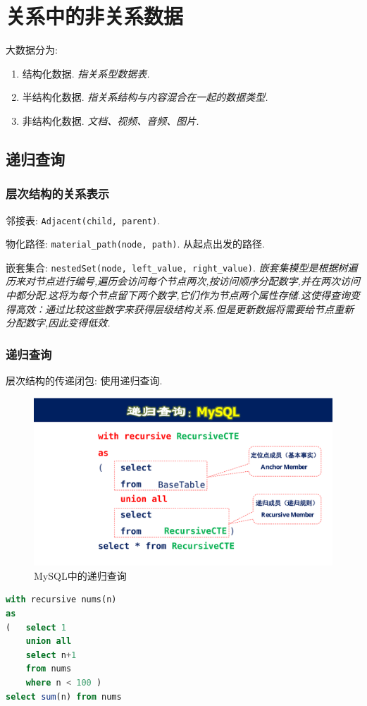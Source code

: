 \chapter{关系中的非关系数据}

大数据分为:
\begin{enumerate}
    \item 结构化数据. \textit{指关系型数据表.}
    \item 半结构化数据. \textit{指关系结构与内容混合在一起的数据类型.}
    \item 非结构化数据. \textit{文档、视频、音频、图片.}
\end{enumerate}

\section{递归查询}

\subsection{层次结构的关系表示}

邻接表: \verb|Adjacent(child, parent)|.

物化路径: \verb|material_path(node, path)|. 从起点出发的路径.

嵌套集合: \verb|nestedSet(node, left_value, right_value)|. \textit{嵌套集模型是根据树遍历来对节点进行编号,遍历会访问每个节点两次,按访问顺序分配数字,并在两次访问中都分配.这将为每个节点留下两个数字,它们作为节点两个属性存储.这使得查询变得高效：通过比较这些数字来获得层级结构关系.但是更新数据将需要给节点重新分配数字,因此变得低效.}

\subsection{递归查询}

层次结构的传递闭包: 使用递归查询.

\begin{figure}[H]
    \centering
    \includegraphics[width=.4\textwidth]{./image/递归查询.pdf}
    \caption{MySQL中的递归查询}
\end{figure}

\begin{lstlisting}[language=SQL]
with recursive nums(n)
as
(   select 1
    union all
    select n+1
    from nums
    where n < 100 )
select sum(n) from nums
\end{lstlisting}

